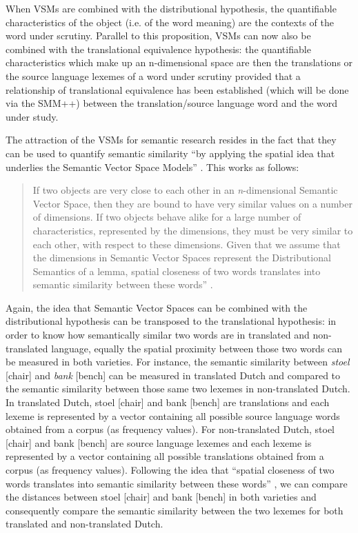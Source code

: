When VSMs are combined with the distributional hypothesis, the quantifiable characteristics of the object (i.e. of the word meaning) are the contexts of the word under scrutiny. Parallel to this proposition, VSMs can now also be combined with the translational equivalence hypothesis: the quantifiable characteristics which make up an n-dimensional space are then the translations or the source language lexemes of a word under scrutiny provided that a relationship of translational equivalence has been established (which will be done via the SMM++) between the translation\slash source language word and the word under study.

The attraction of the VSMs for semantic research resides in the fact that they can be used to quantify semantic similarity “by applying the spatial idea that underlies the Semantic Vector Space Models” \citep[213]{szmrecsanyi_semantic_2014}. This works as follows:

\begin{quote}
If two objects are very close to each other in an \textit{n}{}-dimensional Semantic Vector Space, then they are bound to have very similar values on a number of dimensions. If two objects behave alike for a large number of characteristics, represented by the dimensions, they must be very similar to each other, with respect to these dimensions. Given that we assume that the dimensions in Semantic Vector Spaces represent the Distributional Semantics of a lemma, spatial closeness of two words translates into semantic similarity between these words” \citep[213]{szmrecsanyi_semantic_2014}.
\end{quote}

Again, the idea that Semantic Vector Spaces can be combined with the distributional hypothesis can be transposed to the translational hypothesis: in order to know how semantically similar two words are in translated and non-translated language, equally the spatial proximity between those two words can be measured in both varieties. For instance, the semantic similarity between \textit{stoel} [chair] and \textit{bank} [bench] can be measured in translated Dutch and compared to the semantic similarity between those same two lexemes in non-translated Dutch. In translated Dutch, stoel [chair] and bank [bench] are translations and each lexeme is represented by a vector containing all possible source language words obtained from a corpus (as frequency values). For non-translated Dutch, stoel [chair] and bank [bench] are source language lexemes and each lexeme is represented by a vector containing all possible translations obtained from a corpus (as frequency values). Following the idea that “spatial closeness of two words translates into semantic similarity between these words” \citep[213]{szmrecsanyi_semantic_2014}, we can compare the distances between stoel [chair] and bank [bench] in both varieties and consequently compare the semantic similarity between the two lexemes for both translated and non-translated Dutch. 

